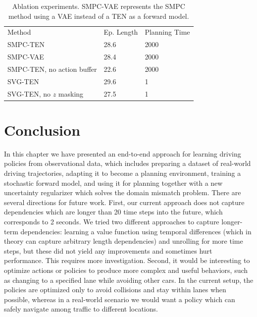 \documentclass{article} %
\begin{document}
  \begin{table}[t]
    \centering
  \begin{tabular}{|lll|}
    \hline
    Method & Ep. Length & Planning Time \\
    \hhline{|===|}
    SMPC-TEN & 28.6  & 2000 \\
    SMPC-VAE & 28.4 & 2000 \\
    SMPC-TEN, no action buffer & 22.6 & 2000 \\
    \hline
    SVG-TEN & 29.6 & 1 \\
    SVG-TEN, no $z$ masking & 27.5 & 1 \\
    \hline
  \end{tabular}
  \caption{Ablation experiments. SMPC-VAE represents the SMPC method using a VAE instead of a TEN as a forward model.}
  \label{ablation}
  \end{table}


  \section{Conclusion}

  In this chapter we have presented an end-to-end approach for learning driving policies from observational data, which includes preparing a dataset of real-world driving trajectories, adapting it to become a planning environment, training a stochastic forward model, and using it for planning together with a new uncertainty regularizer which solves the domain mismatch problem.
  There are several directions for future work.
  First, our current approach does not capture dependencies which are longer than 20 time steps into the future, which corresponds to 2 seconds.
  We tried two different approaches to capture longer-term dependencies: learning a value function using temporal differences (which in theory can capture arbitrary length dependencies) and unrolling for more time steps, but these did not yield any improvements and sometimes hurt performance. This requires more investigation.
  Second, it would be interesting to optimize actions or policies to produce more complex and useful behaviors, such as changing to a specified lane while avoiding other cars.
  In the current setup, the policies are optimized only to avoid collisions and stay within lanes when possible, whereas in a real-world scenario we would want a policy which can safely navigate among traffic to different locations.
\end{document}
